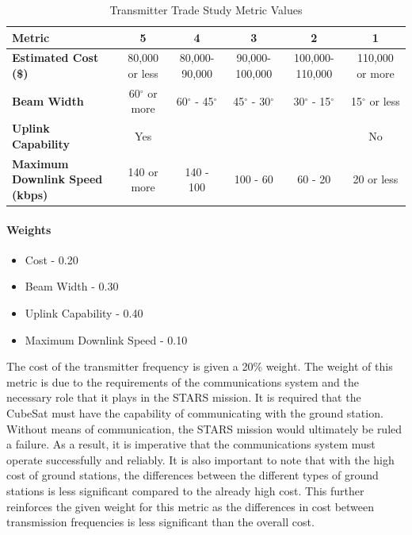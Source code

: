 \begin{table}[H]
\centering
\begin{tabular}{|p{3.5cm}|c|c|c|c|c|}
\hline
    \textbf{Metric} & \textbf{5} & \textbf{4} & \textbf{3} & \textbf{2} & \textbf{1}
    \\
\hline
    \textbf{Estimated Cost (\$)} & 80,000 or less & 80,000-90,000 & 90,000-100,000 & 100,000-110,000 & 110,000 or more
    \\
\hline
    \textbf{Beam Width} & 60$^{\circ}$ or more & 60$^{\circ}$ - 45$^{\circ}$ & 45$^{\circ}$ - 30$^{\circ}$ & 30$^{\circ}$ - 15$^{\circ}$ & 15$^{\circ}$ or less

    \\
\hline
    \textbf{Uplink Capability} & Yes &  &  &  & No
    \\
\hline
    \textbf{Maximum Downlink Speed (kbps)} & 140 or more & 140 - 100 & 100 - 60 & 60 - 20 & 20 or less
    \\

\hline
\end{tabular}
\caption{Transmitter Trade Study Metric Values}
\label{tbl:Transmitter_Metric_Scores}
\end{table}

\paragraph{Weights}
\begin{itemize}
    \item Cost - 0.20
    \item Beam Width - 0.30
    \item Uplink Capability - 0.40
    \item Maximum Downlink Speed - 0.10
\end{itemize}

The cost of the transmitter frequency is given a 20\% weight. The weight of this metric is due to the requirements of the communications system and the necessary role that it plays in the STARS mission. It is required that the CubeSat must have the capability of communicating with the ground station. Without means of communication, the STARS mission would ultimately be ruled a failure. As a result, it is imperative that the communications system must operate successfully and reliably. It is also important to note that with the high cost of ground stations, the differences between the different types of ground stations is less significant compared to the already high cost. This further reinforces the given weight for this metric as the differences in cost between transmission frequencies is less significant than the overall cost. 

